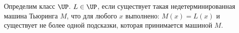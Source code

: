 Определим класс $\UP$. $L \in \UP$, если существует такая недетерминированная машина Тьюринга $M$, что для любого $x$
выполнено: $M(x) = L(x)$ и существует не более одной подсказки, которая принимается машиной $M$.